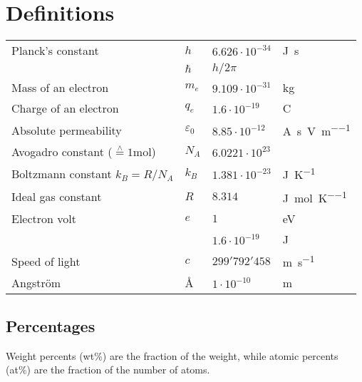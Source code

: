 \section{Definitions}

\begin{table*}[ht]
    \begin{tabularx}{\linewidth}{Xlll}
        \toprule
    	Planck's constant & $h$ & $6.626 \cdot 10^{-34}$ & \si{\J\second} \\
    		& $\hbar$ & $h / 2\pi$ & \\
    	Mass of an electron & $m_e$ &  $9.109 \cdot 10^{-31}$ & \si{\kilogram} \\
    	Charge of an electron & $q_e$ & $1.6 \cdot 10^{-19}$ & \si{\coulomb} \\
    	Absolute permeability & $\varepsilon_0$ & $8.85 \cdot 10^{-12}$ & \si{\ampere\second\per\volt\per\meter} \\
    	Avogadro constant  ($\stackrel{\wedge}{=}1$\si{\mol})& $N_A$ & $6.0221 \cdot 10^{23}$ & \\
    	Boltzmann constant $k_B = R / N_A$& $k_B$ & $1.381 \cdot10^{-23}$ & \si{\J\per\K} \\
    	Ideal gas constant & $R$ & $8.314$ & \si{\J\per\mol\per\K} \\
    	Electron volt & $e$ & $1$ & \si{\eV} \\
    		& & $1.6 \cdot 10^{-19}$ & \si{\J} \\ 
    	Speed of light & $c$ & $299'792'458$ & \si{\meter\per\second} \\
    	Angström & \AA & $1 \cdot 10^{-10}$ & \si{\meter} \\
    	\bottomrule
    \end{tabularx}
\end{table*}

\subsection{Percentages}
Weight percents (wt\%) are the fraction of the weight, while atomic percents (at\%) are the fraction of the number of atoms.